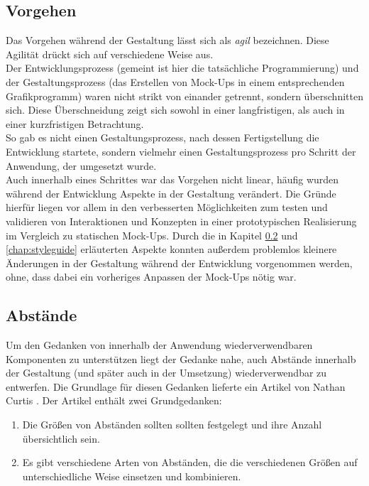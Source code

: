 \subsection{Vorgehen}
Das Vorgehen während der Gestaltung lässt sich als \textit{agil} bezeichnen. Diese Agilität drückt sich auf verschiedene Weise aus.\\
Der Entwicklungsprozess (gemeint ist hier die tatsächliche Programmierung) und der Gestaltungsprozess (das Erstellen von Mock-Ups in einem entsprechenden Grafikprogramm) waren nicht strikt von einander getrennt, sondern überschnitten sich. Diese Überschneidung zeigt sich sowohl in einer langfristigen, als auch in einer kurzfristigen Betrachtung.\\
So gab es nicht einen Gestaltungsprozess, nach dessen Fertigstellung die Entwicklung startete, sondern vielmehr einen Gestaltungsprozess pro Schritt der Anwendung, der umgesetzt wurde.\\
Auch innerhalb eines Schrittes war das Vorgehen nicht linear, häufig wurden während der Entwicklung Aspekte in der Gestaltung verändert. Die Gründe hierfür liegen vor allem in den verbesserten Möglichkeiten zum testen und validieren von Interaktionen und Konzepten in einer prototypischen Realisierung im Vergleich zu statischen Mock-Ups.
Durch die in Kapitel \ref{chap:spacing} und \ref{chap:styleguide} erläuterten Aspekte konnten außerdem problemlos kleinere Änderungen in der Gestaltung während der Entwicklung vorgenommen werden, ohne, dass dabei ein vorheriges Anpassen der Mock-Ups nötig war.

\subsection{Abstände}
\label{chap:spacing}
Um den Gedanken von innerhalb der Anwendung wiederverwendbaren Komponenten zu unterstützen liegt der Gedanke nahe, auch Abstände innerhalb der Gestaltung (und später auch in der Umsetzung) wiederverwendbar zu entwerfen. Die Grundlage für diesen Gedanken lieferte ein Artikel von Nathan Curtis \cite{CurtisSpace16}. Der Artikel enthält zwei Grundgedanken:

\begin{enumerate}
  \item Die Größen von Abständen sollten sollten festgelegt und ihre Anzahl übersichtlich sein.
  \item Es gibt verschiedene Arten von Abständen, die die verschiedenen Größen auf unterschiedliche Weise einsetzen und kombinieren.
\end{enumerate}

